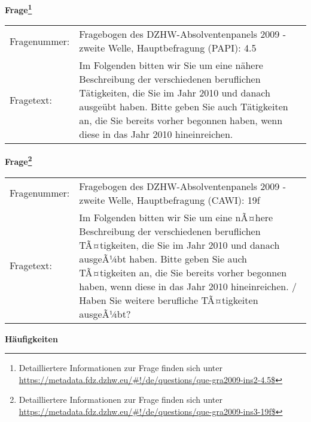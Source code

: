 				\vspace*{0.5cm}
                \noindent\textbf{Frage\footnote{Detailliertere Informationen zur Frage finden sich unter
		              \url{https://metadata.fdz.dzhw.eu/\#!/de/questions/que-gra2009-ins2-4.5$}}}\\
				\begin{tabularx}{\hsize}{@{}lX}
					Fragenummer: &
					  Fragebogen des DZHW-Absolventenpanels 2009 - zweite Welle, Hauptbefragung (PAPI):
					  4.5
 \\
					Fragetext: & Im Folgenden bitten wir Sie um eine nähere Beschreibung der verschiedenen beruflichen Tätigkeiten, die Sie im Jahr 2010 und danach ausgeübt haben. Bitte geben Sie auch Tätigkeiten an, die Sie bereits vorher begonnen haben, wenn diese in das Jahr 2010 hineinreichen. \\
				\end{tabularx}
				\vspace*{0.5cm}
                \noindent\textbf{Frage\footnote{Detailliertere Informationen zur Frage finden sich unter
		              \url{https://metadata.fdz.dzhw.eu/\#!/de/questions/que-gra2009-ins3-19f$}}}\\
				\begin{tabularx}{\hsize}{@{}lX}
					Fragenummer: &
					  Fragebogen des DZHW-Absolventenpanels 2009 - zweite Welle, Hauptbefragung (CAWI):
					  19f
 \\
					Fragetext: & Im Folgenden bitten wir Sie um eine nÃ¤here Beschreibung der verschiedenen beruflichen TÃ¤tigkeiten, die Sie im Jahr 2010 und danach ausgeÃ¼bt haben. Bitte geben Sie auch TÃ¤tigkeiten an, die Sie bereits vorher begonnen haben, wenn diese in das Jahr 2010 hineinreichen. / Haben Sie weitere berufliche TÃ¤tigkeiten ausgeÃ¼bt? \\
				\end{tabularx}





        		\vspace*{0.5cm}
                \noindent\textbf{Häufigkeiten}

